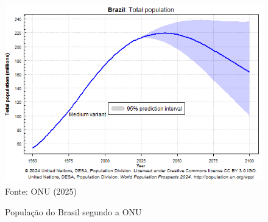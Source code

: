 \begin{figure}[ht]
    \centering
    \caption{População do Brasil segundo a ONU}
    \includegraphics[width=1\linewidth]{figuras/populacao/brazil_population.png}
    \label{fig:brazil_population}
    \footnotesize{Fonte: ONU (2025)}
\end{figure}


